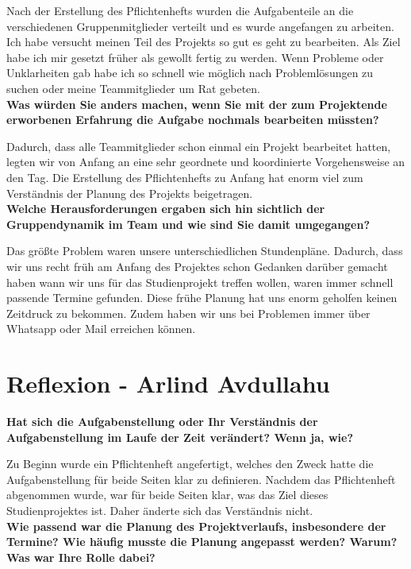 Nach der Erstellung des Pflichtenhefts wurden die Aufgabenteile an die verschiedenen Gruppenmitglieder verteilt und es wurde angefangen zu arbeiten. Ich habe versucht meinen Teil des Projekts so gut es geht zu bearbeiten. Als Ziel habe ich mir gesetzt früher als gewollt fertig zu werden. Wenn Probleme oder Unklarheiten gab habe ich so schnell wie möglich nach Problemlösungen zu suchen oder meine Teammitglieder um Rat gebeten.
\\

\textbf {Was würden Sie anders machen, wenn Sie mit der zum Projektende erworbenen Erfahrung die Aufgabe nochmals bearbeiten müssten?}

Dadurch, dass alle Teammitglieder schon einmal ein Projekt bearbeitet hatten, legten wir von Anfang an eine sehr geordnete und koordinierte Vorgehensweise an den Tag. Die Erstellung des Pflichtenhefts zu Anfang hat enorm viel zum Verständnis der Planung des Projekts beigetragen.
\\

\textbf {Welche Herausforderungen ergaben sich hin sichtlich der Gruppendynamik im Team und wie sind Sie damit umgegangen?}

Das größte Problem waren unsere unterschiedlichen Stundenpläne.
Dadurch, dass wir uns recht früh am Anfang des Projektes schon Gedanken darüber gemacht haben wann wir uns für das Studienprojekt treffen wollen, waren immer schnell passende Termine gefunden. 
Diese frühe Planung hat uns enorm geholfen keinen Zeitdruck zu bekommen. Zudem haben wir uns bei Problemen immer über Whatsapp oder Mail erreichen können.

\newpage
\chapter{Reflexion - Arlind Avdullahu}
\textbf{Hat sich die Aufgabenstellung oder Ihr Verständnis der Aufgabenstellung im Laufe
der Zeit verändert? Wenn ja, wie?}

Zu Beginn wurde ein Pflichtenheft angefertigt, welches den Zweck hatte die Aufgabenstellung für beide Seiten klar zu definieren. Nachdem das Pflichtenheft abgenommen wurde, war für beide Seiten klar, was das Ziel dieses Studienprojektes ist. Daher änderte sich das Verständnis nicht.
\\

\textbf{Wie passend war die Planung des Projektverlaufs, insbesondere der Termine? Wie
häufig musste die Planung angepasst werden? Warum? Was war Ihre Rolle dabei?}

